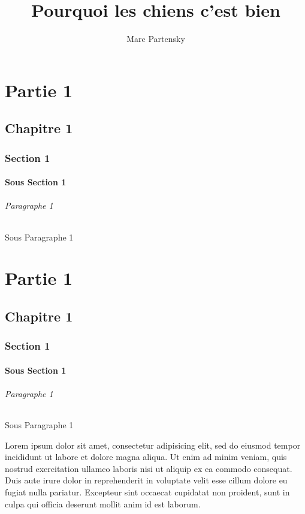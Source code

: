 \documentclass{report}
\title{Pourquoi les chiens c'est bien}
\author{Marc Partensky}
\begin{document}
\maketitle



\part{Partie 1}
\chapter{Chapitre 1}
\section{Section 1}
\subsection{Sous Section 1}
\paragraph{Paragraphe 1}
\subparagraph{Sous Paragraphe 1}
\part{Partie 1}
\chapter{Chapitre 1}
\section{Section 1}
\subsection{Sous Section 1}
\paragraph{Paragraphe 1}
\subparagraph{Sous Paragraphe 1}

Lorem ipsum dolor sit amet, consectetur adipisicing elit, sed do eiusmod tempor incididunt ut labore et dolore magna aliqua. Ut enim ad minim veniam, quis nostrud exercitation ullamco laboris nisi ut aliquip ex ea commodo consequat. Duis aute irure dolor in reprehenderit in voluptate velit esse cillum dolore eu fugiat nulla pariatur. Excepteur sint occaecat cupidatat non proident, sunt in culpa qui officia deserunt mollit anim id est laborum.
\end{document}

